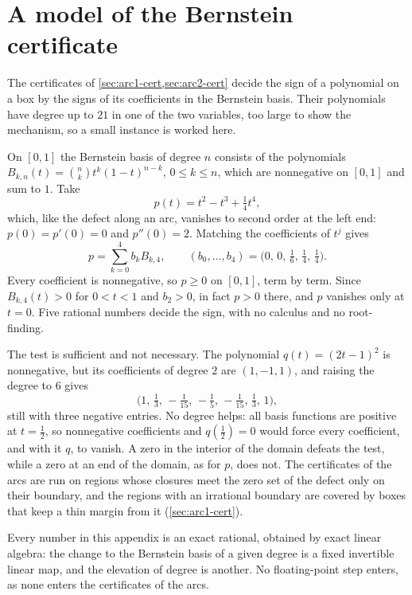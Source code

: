 \documentclass[11pt,reqno]{amsart}
\renewcommand{\_}{\origunderscore\allowbreak}
\numberwithin{equation}{section}
\theoremstyle{plain}
\theoremstyle{definition}
\theoremstyle{remark}
\begin{document}
\section{A model of the Bernstein certificate}\label{app:bernstein-toy}

The certificates of \cref{sec:arc1-cert,sec:arc2-cert} decide the sign of
a polynomial on a box by the signs of its coefficients in the Bernstein
basis. Their polynomials have degree up to $21$ in one of the two variables,
too large to show the mechanism, so a small instance is worked here.

On $[0,1]$ the Bernstein basis of degree $n$ consists of the polynomials
$B_{k,n}(t)=\binom nkt^k(1-t)^{n-k}$, $0\le k\le n$, which are nonnegative
on $[0,1]$ and sum to $1$. Take
\[
  p(t)=t^2-t^3+\tfrac14t^4 ,
\]
which, like the defect along an arc, vanishes to second order at the left
end: $p(0)=p'(0)=0$ and $p''(0)=2$. Matching the coefficients of $t^j$
gives
\[
  p=\sum_{k=0}^4b_kB_{k,4},\qquad
  (b_0,\dots,b_4)=\bigl(0,\,0,\,\tfrac16,\,\tfrac14,\,\tfrac14\bigr).
\]
Every coefficient is nonnegative, so $p\ge0$ on $[0,1]$, term by term.
Since $B_{k,4}(t)>0$ for $0<t<1$ and $b_2>0$, in fact $p>0$ there, and $p$
vanishes only at $t=0$. Five rational numbers decide the sign, with no
calculus and no root-finding.

The test is sufficient and not necessary. The polynomial
$q(t)=(2t-1)^2$ is nonnegative, but its coefficients of degree $2$ are
$(1,-1,1)$, and raising the degree to $6$ gives
\[
  \bigl(1,\,\tfrac13,\,-\tfrac1{15},\,-\tfrac15,\,-\tfrac1{15},\,\tfrac13,\,1\bigr),
\]
still with three negative entries. No degree helps: all basis functions are
positive at $t=\frac12$, so nonnegative coefficients and $q(\frac12)=0$
would force every coefficient, and with it $q$, to vanish. A zero in the
interior of the domain defeats the test, while a zero at an end of the
domain, as for $p$, does not. The certificates of the arcs are run on
regions whose closures meet the zero set of the defect only on their
boundary, and the regions with an irrational boundary are covered by boxes
that keep a thin margin from it (\cref{sec:arc1-cert}).

Every number in this appendix is an exact rational, obtained by exact
linear algebra: the change to the Bernstein basis of a given degree is a
fixed invertible linear map, and the elevation of degree is another. No
floating-point step enters, as none enters the certificates of the arcs.


\end{document}
